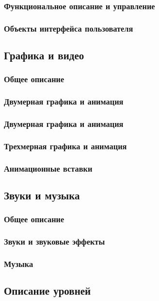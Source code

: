 \documentclass{article}
\begin{document}
\subsubsection{Функциональное описание и управление}

\subsubsection{Объекты интерфейса пользователя}

\subsection{Графика и видео}
\subsubsection{Общее описание}
\subsubsection{Двумерная графика и анимация}
\subsubsection{Двумерная графика и анимация}
\subsubsection{Трехмерная графика и анимация}
\subsubsection{Анимационные вставки}
\subsection{Звуки и музыка}
\subsubsection{Общее описание}
\subsubsection{Звуки и звуковые эффекты}
\subsubsection{Музыка}
\subsection{Описание уровней}
\end{document}
